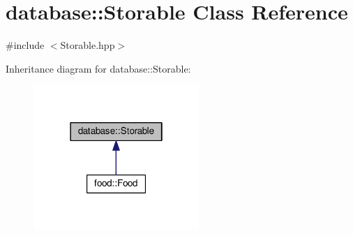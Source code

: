 \hypertarget{classdatabase_1_1_storable}{}\section{database\+:\+:Storable Class Reference}
\label{classdatabase_1_1_storable}


{\ttfamily \#include $<$Storable.\+hpp$>$}



Inheritance diagram for database\+:\+:Storable\+:
\nopagebreak
\begin{figure}[H]
\begin{center}
\leavevmode
\includegraphics[width=178pt]{classdatabase_1_1_storable__inherit__graph}
\end{center}
\end{figure}
